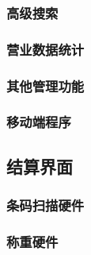 \subsubsection{高级搜索}

\subsubsection{营业数据统计}

\subsubsection{其他管理功能}

\subsubsection{移动端程序}

\subsection{结算界面}

\subsubsection{条码扫描硬件}

\subsubsection{称重硬件}